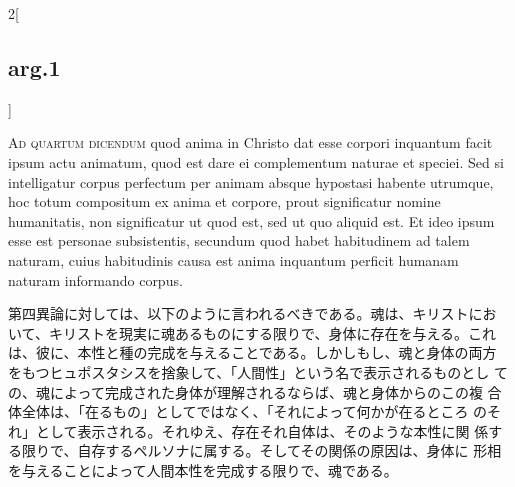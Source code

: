 \documentclass[paper=a4paper,fontsize=10pt,jafontsize=9pt,titlepage]{jlreq}
\begin{document}
\begin{paracol}{2}[\subsection{arg.1}]
\switchcolumn*[\subsection{ad.4}]

{\scshape Ad quartum dicendum} quod anima in Christo dat esse corpori
inquantum facit ipsum actu animatum, quod est dare ei complementum
naturae et speciei. Sed si intelligatur corpus perfectum per animam
absque hypostasi habente utrumque, hoc totum compositum ex anima et
corpore, prout significatur nomine humanitatis, non significatur ut
quod est, sed ut quo aliquid est. Et ideo ipsum esse est personae
subsistentis, secundum quod habet habitudinem ad talem naturam, cuius
habitudinis causa est anima inquantum perficit humanam naturam
informando corpus.

\switchcolumn

第四異論に対しては、以下のように言われるべきである。魂は、キリストにお
いて、キリストを現実に魂あるものにする限りで、身体に存在を与える。これ
は、彼に、本性と種の完成を与えることである。しかしもし、魂と身体の両方
をもつヒュポスタシスを捨象して、「人間性」という名で表示されるものとし
ての、魂によって完成された身体が理解されるならば、魂と身体からのこの複
合体全体は、「在るもの」としてではなく、「それによって何かが在るところ
のそれ」として表示される。それゆえ、存在それ自体は、そのような本性に関
係する限りで、自存するペルソナに属する。そしてその関係の原因は、身体に
形相を与えることによって人間本性を完成する限りで、魂である。

\end{paracol}
\end{document}
